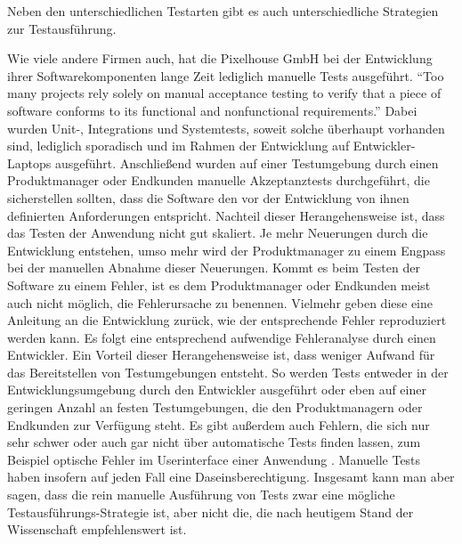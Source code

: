 Neben den unterschiedlichen Testarten gibt es auch unterschiedliche Strategien zur Testausführung.

Wie viele andere Firmen auch, hat die Pixelhouse GmbH bei der Entwicklung ihrer Softwarekomponenten lange Zeit lediglich manuelle Tests ausgeführt. "`Too many projects rely solely on manual acceptance testing to verify that a piece of software conforms to its functional and nonfunctional requirements."' \citep[S.][S. 83]{HumFar10} Dabei wurden Unit-, Integrations und Systemtests, soweit solche überhaupt vorhanden sind, lediglich sporadisch und im Rahmen der Entwicklung auf Entwickler-Laptops ausgeführt. Anschließend wurden auf einer Testumgebung durch einen Produktmanager oder Endkunden manuelle Akzeptanztests durchgeführt, die sicherstellen sollten, dass die Software den vor der Entwicklung von ihnen definierten Anforderungen entspricht. Nachteil dieser Herangehensweise ist, dass das Testen der Anwendung nicht gut skaliert. Je mehr Neuerungen durch die Entwicklung entstehen, umso mehr wird der Produktmanager zu einem Engpass bei der manuellen Abnahme dieser Neuerungen. Kommt es beim Testen der Software zu einem Fehler, ist es dem Produktmanager oder Endkunden meist auch nicht möglich, die Fehlerursache zu benennen. Vielmehr geben diese eine Anleitung an die Entwicklung zurück, wie der entsprechende Fehler reproduziert werden kann. Es folgt eine entsprechend aufwendige Fehleranalyse durch einen Entwickler. Ein Vorteil dieser Herangehensweise ist, dass weniger Aufwand für das Bereitstellen von Testumgebungen entsteht. So werden Tests entweder in der Entwicklungsumgebung durch den Entwickler ausgeführt oder eben auf einer geringen Anzahl an festen Testumgebungen, die den Produktmanagern oder Endkunden zur Verfügung steht. Es gibt außerdem auch Fehlern, die sich nur sehr schwer oder auch gar nicht über automatische Tests finden lassen, zum Beispiel optische Fehler im Userinterface einer Anwendung \citep[Vgl.][S. 197]{DuvMatAnd07}. Manuelle Tests haben insofern auf jeden Fall eine Daseinsberechtigung. Insgesamt kann man aber sagen, dass die rein manuelle Ausführung von Tests zwar eine mögliche Testausführungs-Strategie ist, aber nicht die, die nach heutigem Stand der Wissenschaft empfehlenswert ist.

